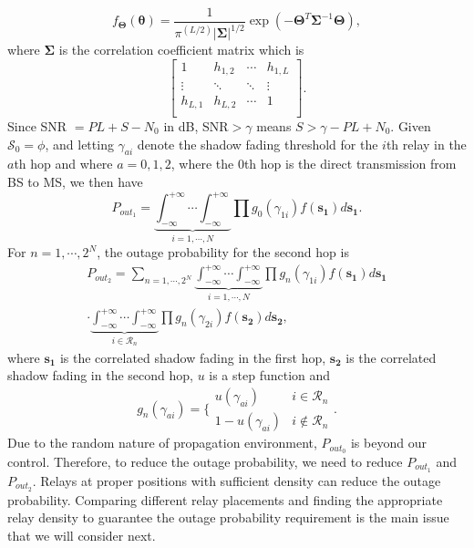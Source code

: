 \begin{equation}
f_{\mathbf{\Theta}}(\boldsymbol{\theta}) = \frac{1}{\pi^(L/2)|\mathbf{\Sigma}|^{1/2}}\exp(-\mathbf{\Theta}^{T}\mathbf{\Sigma}^{-1}\mathbf{\Theta}),
\end{equation}
where $\mathbf{\Sigma}$ is the correlation coefficient matrix which is
\begin{equation}
\left[\begin{array}{cccc}
1 & h_{1,2} & \cdots & h_{1,L}\\
\vdots & \ddots & \ddots & \vdots\\
h_{L,1} & h_{L,2} & \cdots & 1\\
\end{array}\right].
\end{equation}
Since SNR $=PL+S-N_{0}$ in dB, SNR$>\gamma$ means $S>\gamma-PL+N_{0}$.
Given $\mathcal{S}_{0}=\phi$, and letting $\gamma_{ai}$ denote the shadow fading threshold for the $i$th relay in the $a$th hop and where $a=0,1,2$, where the $0$th hop is the direct transmission from BS to MS, we then have
\begin{equation}
P_{out_{1}} = \underbrace{\int_{-\infty}^{+\infty}\cdots\int_{-\infty}^{+\infty}}_{i =1,\cdots,N}\prod g_{0}(\gamma_{1i})f(\mathbf{s_{1}})d\mathbf{s_{1}}.
\end{equation}
For $n=1,\cdots,2^{N}$, the outage probability for the second hop is
\begin{equation}
\begin{split}
P_{out_{2}} = \sum_{n=1,\cdots,2^{N}}\underbrace{\int_{-\infty}^{+\infty}\cdots\int_{-\infty}^{+\infty}}_{i=1,\cdots,N}\prod g_{n}(\gamma_{1i}) f(\mathbf{s_{1}})d\mathbf{s_{1}}\\
\cdot\underbrace{\int_{-\infty}^{+\infty}\cdots\int_{-\infty}^{+\infty}}_{i\in \mathcal{R}_{n}}\prod g_{n}(\gamma_{2i})f(\mathbf{s_{2}})d\mathbf{s_{2}},
\end{split}
\end{equation}
where $\mathbf{s_{1}}$ is the correlated shadow fading in the first hop, $\mathbf{s_{2}}$ is the correlated shadow fading in the second hop, $u$ is a step function and
\begin{equation}
g_{n}(\gamma_{ai}) = \{\begin{array}{cc}
               u(\gamma_{ai}) & i\in \mathcal{R}_{n} \\
               1-u(\gamma_{ai}) & i\notin \mathcal{R}_{n}
             \end{array}.
\end{equation}
Due to the random nature of propagation environment, $P_{out_{0}}$ is beyond our control. Therefore, to reduce the outage probability, we need to reduce $P_{out_{1}}$ and $P_{out_{2}}$. Relays at proper positions with sufficient density can reduce the outage probability. Comparing different relay placements and finding the appropriate relay density to guarantee the outage probability requirement is the main issue that we will consider next.

